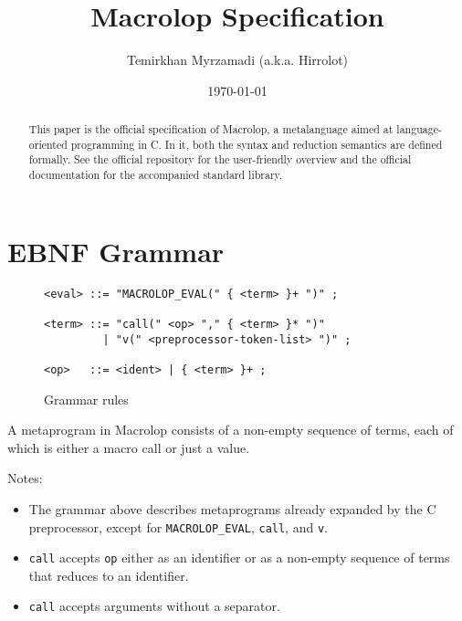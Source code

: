\documentclass[12pt]{article}
\theoremstyle{break}
\begin{document}
\title{Macrolop Specification}
\date{\today}
\author{Temirkhan Myrzamadi (a.k.a. Hirrolot)}
\maketitle

\begin{abstract}
This paper is the official specification of Macrolop, a metalanguage aimed at language-oriented
programming in C. In it, both the syntax and reduction semantics are defined formally. See the
official repository \cite{Macrolop} for the user-friendly overview and the official documentation
\cite{MacrolopDocs} for the accompanied standard library.
\end{abstract}

\tableofcontents

\newpage

\section{EBNF Grammar}

\begin{figure}[H]
    \caption{Grammar rules}

\begin{verbatim}
<eval> ::= "MACROLOP_EVAL(" { <term> }+ ")" ;

<term> ::= "call(" <op> "," { <term> }* ")"
         | "v(" <preprocessor-token-list> ")" ;

<op>   ::= <ident> | { <term> }+ ;
\end{verbatim}

\end{figure}

A metaprogram in Macrolop consists of a non-empty sequence of terms, each of which
is either a macro call or just a value.

Notes:

\begin{itemize}
    \item The grammar above describes metaprograms already expanded by the C preprocessor,
    except for \texttt{MACROLOP\_EVAL}, \texttt{call}, and \texttt{v}.
    \item \texttt{call} accepts \texttt{op} either as an identifier or as a non-empty
    sequence of terms that reduces to an identifier.
    \item \texttt{call} accepts arguments without a separator.
\end{itemize}
\end{document}
